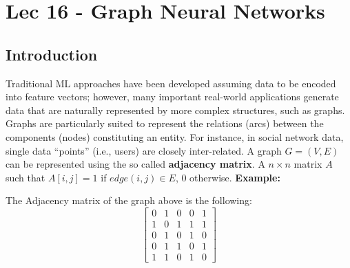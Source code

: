 \chapter{Lec 16 - Graph Neural Networks}

\section{Introduction}
Traditional ML approaches have been developed assuming data to be encoded into feature vectors; however, many important real-world applications generate data that are naturally represented by more complex structures, such as graphs. Graphs are particularly suited to
represent the relations (arcs) between the components (nodes) constituting an entity. For instance, in social network data, single data “points” (i.e., users) are closely inter-related.\newline\newline
A graph $G = (V, E)$ can be represented using the so called \textbf{adjacency matrix}. A $n \times n$ matrix $A$ such that $A[i,j] = 1$ if $edge(i,j) \in E$, 0 otherwise.\newline\newline
    \textbf{Example:}\newline\newline
    \begin{center}
    \end{center}
    The Adjacency matrix of the graph above is the following:
    \[\begin{bmatrix}
        0 & 1 & 0 & 0 & 1 \\
        1 & 0 & 1 & 1 & 1 \\
        0 & 1 & 0 & 1 & 0 \\
        0 & 1 & 1 & 0 & 1 \\
        1 & 1 & 0 & 1 & 0
    \end{bmatrix}\]
